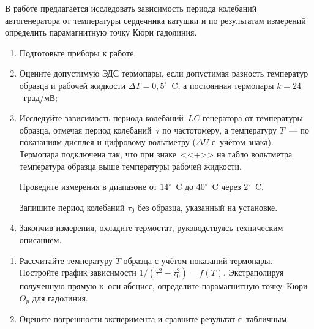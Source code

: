 \begin{lab:task}

	В работе предлагается исследовать зависимость периода колебаний автогенератора от температуры сердечника катушки и по
	результатам измерений определить парамагнитную точку Кюри гадолиния.
	
	\begin{enumerate}
		\item Подготовьте приборы к работе.
		
		\item Оцените допустимую ЭДС термопары, если допустимая разность температур образца и рабочей жидкости $\Delta T=0,5^\circ$~C, а
		постоянная термопары $k=24$~град/мВ;
		
		\item Исследуйте зависимость периода колебаний~$LC$-генератора от температуры образца, отмечая период колебаний~$\tau$
		по частотомеру, а температуру $T$~--- по показаниям дисплея и цифровому вольтметру ($\Delta U$ с~учётом знака). Термопара
		подключена так, что при знаке~<<+>> на табло вольтметра температура образца выше температуры рабочей жидкости.
		
		Проведите измерения в диапазоне от $14^\circ$~C до $40^\circ$~C через $2^\circ$~C.
		
		Запишите период колебаний $\tau_0$ без образца, указанный на установке.
		
		\item Закончив измерения, охладите термостат, руководствуясь техническим описанием.
	
	\end{enumerate}
	
	\begin{enumerate}
	
		\item Рассчитайте температуру $T$ образца с учётом показаний термопары. Постройте график зависимости $1/(\tau^2-\tau_0^2)=f(T)$. 
		Экстраполируя полученную прямую к~оси абсцисс, определите парамагнитную точку~Кюри~$\Theta_p$ для гадолиния.
	
		\item Оцените погрешности эксперимента и сравните результат с~табличным.
	
	\end{enumerate}

\end{lab:task}


